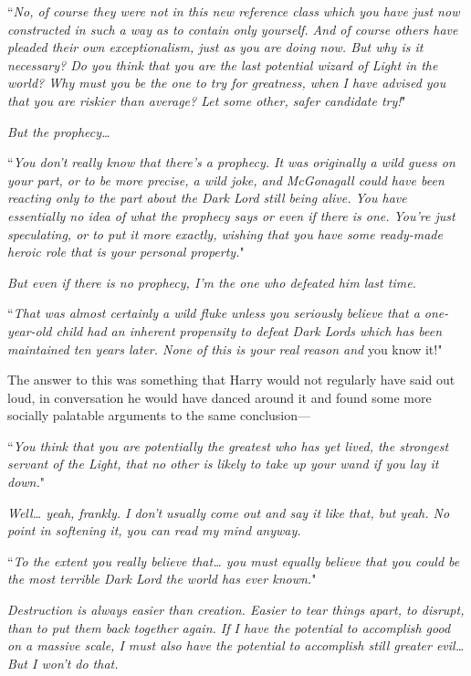 ``\emph{No, of course they were not in this new reference class which you have just now constructed in such a way as to contain only yourself. And of course others have pleaded their own exceptionalism, just as you are doing now. But why is it necessary? Do you think that you are the last potential wizard of Light in the world? Why must \emph{you} be the one to try for greatness, when I have advised you that you are riskier than average? Let some other, safer candidate try!}"

\emph{But the prophecy{\ldots}}

``\emph{You don't really know that there's a prophecy. It was originally a wild guess on your part, or to be more precise, a wild joke, and McGonagall could have been reacting \emph{only} to the part about the Dark Lord still being alive. You have essentially no idea of what the prophecy says or even if there \emph{is} one. You're just speculating, or to put it more exactly, \emph{wishing} that you have some ready-made heroic role that is your personal property.}"

\emph{But even if there is no prophecy, I'm the one who defeated him last time.}

``\emph{That was almost certainly a wild fluke unless you seriously believe that a one-year-old child had an inherent propensity to defeat Dark Lords which has been maintained ten years later. None of this is your real reason and} you know it!"

The answer to this was something that Harry would not regularly have said out loud, in conversation he would have danced around it and found some more socially palatable arguments to the same conclusion—

``\emph{You think that you are potentially the greatest who has yet lived, the strongest servant of the Light, that no other is likely to take up your wand if you lay it down.}"

\emph{Well{\ldots} yeah, frankly. I don't usually come out and say it like that, but yeah. No point in softening it, you can read my mind anyway.}

``\emph{To the extent you really believe that{\ldots} you must equally believe that you could be the most terrible Dark Lord the world has ever known.}"

\emph{Destruction is always easier than creation. Easier to tear things apart, to disrupt, than to put them back together again. If I have the potential to accomplish good on a massive scale, I must also have the potential to accomplish still greater evil{\ldots} But I won't do that.}

